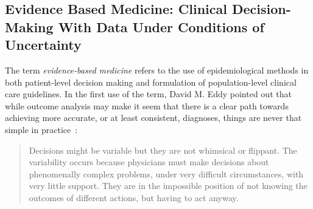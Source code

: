 \documentclass{sigchi}
\begin{document}



\subsection{Evidence Based Medicine: Clinical Decision-Making With Data Under Conditions of  Uncertainty} 

The term \emph{evidence-based medicine} refers to the use of epidemiological methods in both patient-level decision making and formulation of population-level clinical care guidelines.  In the first use of the term, David M. Eddy pointed out that while outcome analysis may make it seem that there is a clear path towards achieving more accurate, or at least consistent, diagnoses, things are never that simple in practice~\cite{eddy1990challenge}:

\begin{quote}
  Decisions might be variable but they are not whimsical or flippant. The variability occurs because physicians must make decisions about phenomenally complex problems, under very difficult circumstances, with very little support. They are in the impossible position of not knowing the outcomes of different actions, but having to act anyway.
\end{quote}
\end{document}
